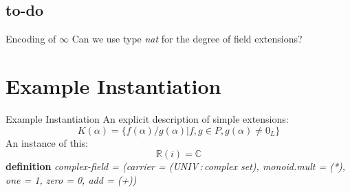 \documentclass[%
	sans,
	12pt,
]{beamer}
\newcommand{\RR}{\mathbb{R}}
\newcommand{\CC}{\mathbb{C}}
\newcommand{\hastype}{\,:\,}
\begin{document}
\subsection{to-do}
\begin{frame}{Encoding of $\infty$}%
Can we use type \emph{nat} for the degree of field extensions?\pause
{}
\end{frame}

\section{Example Instantiation}

\begin{frame}{Example Instantiation}%
An explicit description of simple extensions: %
\[K(\alpha) = \{f(\alpha)/g(\alpha) | f,g \in P, g(\alpha) ≠ \textbf{$0_L$}\}\]\pause
An instance of this:\\
\[\RR(i) = \CC\]\pause
\textbf{definition} \textit{complex-field = (carrier = (UNIV\hastype complex set), monoid.mult = (*), one = 1, zero = 0, add = (+))}
\end{frame}
\end{document}
